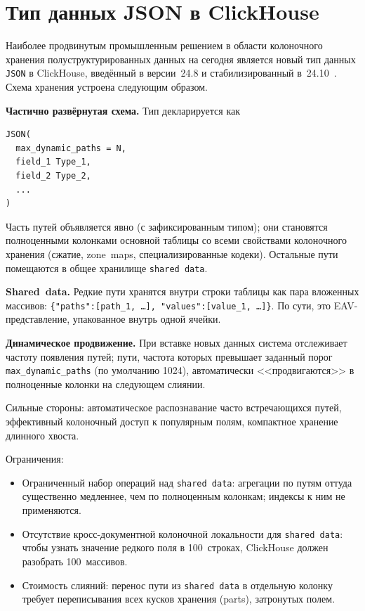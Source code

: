 \section{Тип данных JSON в ClickHouse}

Наиболее продвинутым промышленным решением в области колоночного
хранения полуструктурированных данных на сегодня является новый
тип данных \texttt{JSON} в ClickHouse, введённый в версии~24.8 и
стабилизированный в~24.10~\cite{clickhouse-json}. Схема хранения
устроена следующим образом.

\textbf{Частично развёрнутая схема.} Тип декларируется как
\begin{verbatim}
JSON(
  max_dynamic_paths = N,
  field_1 Type_1,
  field_2 Type_2,
  ...
)
\end{verbatim}

Часть путей объявляется явно (с зафиксированным типом); они
становятся полноценными колонками основной таблицы со всеми
свойствами колоночного хранения (сжатие, zone~maps,
специализированные кодеки). Остальные пути помещаются в общее
хранилище \texttt{shared~data}.

\textbf{Shared~data.} Редкие пути хранятся внутри строки таблицы
как пара вложенных массивов: \texttt{\{"paths":[path\_1, \ldots],
"values":[value\_1, \ldots]\}}. По сути, это EAV-представление,
упакованное внутрь одной ячейки.

\textbf{Динамическое продвижение.} При вставке новых данных
система отслеживает частоту появления путей; пути, частота которых
превышает заданный порог \texttt{max\_dynamic\_paths} (по умолчанию
1024), автоматически <<продвигаются>> в полноценные колонки на
следующем слиянии.

Сильные стороны: автоматическое распознавание часто встречающихся
путей, эффективный колоночный доступ к популярным полям, компактное
хранение длинного хвоста.

Ограничения:
\begin{itemize}
    \item Ограниченный набор операций над \texttt{shared~data}:
    агрегации по путям оттуда существенно медленнее, чем по
    полноценным колонкам; индексы к ним не применяются.
    \item Отсутствие кросс-документной колоночной локальности для
    \texttt{shared~data}: чтобы узнать значение редкого поля в
    100~строках, ClickHouse должен разобрать 100~массивов.
    \item Стоимость слияний: перенос пути из \texttt{shared~data} в
    отдельную колонку требует переписывания всех кусков хранения
    (parts), затронутых полем.
\end{itemize}

